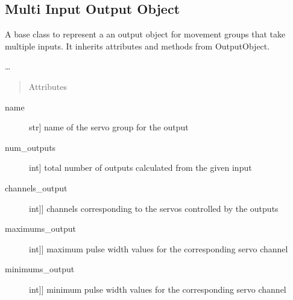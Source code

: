 \documentclass[letterpaper,10pt,english]{sphinxmanual}
\begin{document}
\subsection{Multi Input Output Object}
\label{\detokenize{base:module-MultiInputOutputObject}}\label{\detokenize{base:multi-input-output-object}}

\begin{fulllineitems}
\label{\detokenize{base:MultiInputOutputObject.MultiInputOutputObject}}
\sphinxAtStartPar
A base class to represent a an output object for movement groups that take multiple inputs.
It inherits attributes and methods from OutputObject.

\sphinxAtStartPar
…
\begin{quote}\begin{description}
\item[{Attributes}] \leavevmode
\end{description}\end{quote}
\begin{description}
\item[{name}] \leavevmode{[}str{]}
\sphinxAtStartPar
name of the servo group for the output

\item[{num\_outputs}] \leavevmode{[}int{]}
\sphinxAtStartPar
total number of outputs calculated from the given input

\item[{channels\_output}] \leavevmode{[}{[}int{]}{]}
\sphinxAtStartPar
channels corresponding to the servos controlled by the outputs

\item[{maximums\_output}] \leavevmode{[}{[}int{]}{]}
\sphinxAtStartPar
maximum pulse width values for the corresponding servo channel

\item[{minimums\_output}] \leavevmode{[}{[}int{]}{]}
\sphinxAtStartPar
minimum pulse width values for the corresponding servo channel


\end{description}
\end{fulllineitems}
\end{document}
